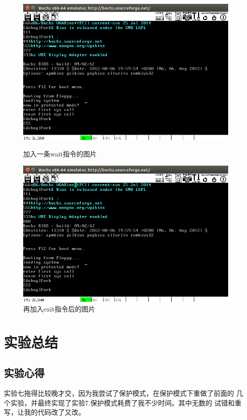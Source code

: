 \documentclass[a4paper]{article}
\begin{document}
    \begin{figure}
    \begin{minipage}{0.48\textwidth}
        \centering
        \includegraphics[width=\linewidth]{assets/pm-ex7-wait.png}
    \caption{加入一条wait指令的图片} \label{fig:wait}
    \end{minipage}\hfill
    \begin{minipage}{0.48\textwidth}
        \centering
        \includegraphics[width=\linewidth]{assets/pm-ex7-wait-and-exit.png}
    \caption{再加入exit指令后的图片} \label{fig:exit}
    \end{minipage}
    \end{figure}    
\section{实验总结}
    \subsection{实验心得}
    实验七拖得比较晚才交，因为我尝试了保护模式，在保护模式下重做了前面的
    几个实验，并最终实现了实验7.保护模式耗费了我不少时间。其中无数的
    试错和重写，让我的代码改了又改。\\ 
\end{document}
